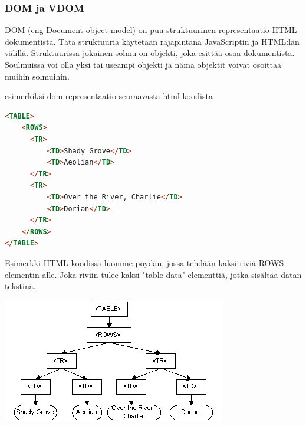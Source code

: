 \medskip



\subsubsection{DOM ja VDOM}





DOM (eng Document object model) on puu-struktuurinen representaatio HTML dokumentista.
Tätä struktuuria käytetään rajapintana JavaScriptin ja HTML:län välillä. 
Struktuurissa jokainen solmu on objekti, joka esittää osaa dokumentista. 
Soulmuissa voi olla yksi tai useampi objekti ja nämä objektit voivat osoittaa muihin solmuihin.



esimerkiksi dom representaatio seuraavasta html koodista

    
\begin{tcolorbox}
\begin{lstlisting}[language=html]
<TABLE>
    <ROWS> 
      <TR> 
          <TD>Shady Grove</TD>
          <TD>Aeolian</TD> 
      </TR> 
      <TR>
          <TD>Over the River, Charlie</TD>
          <TD>Dorian</TD> 
      </TR> 
    </ROWS>
</TABLE>
\end{lstlisting}
\end{tcolorbox}


Esimerkki HTML koodissa luomme pöydän, jossa tehdään kaksi riviä ROWS elementin alle. 
Joka riviin tulee kaksi "table data"{} elementtiä, jotka sisältää datan tekstinä.
\bigskip



\includegraphics{./src/public/oppar/dom.png}

